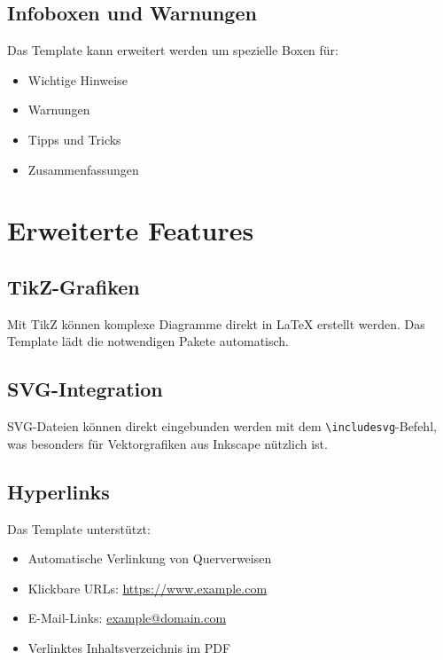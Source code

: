 \subsection*{Infoboxen und Warnungen}
\label{subsec:infoboxen}

Das Template kann erweitert werden um spezielle Boxen für:
\begin{itemize}
	\item Wichtige Hinweise
	\item Warnungen
	\item Tipps und Tricks
	\item Zusammenfassungen
\end{itemize}

\section{Erweiterte Features}
\label{sec:erweiterte_features}

\subsection*{TikZ-Grafiken}
\label{subsec:tikz}

Mit TikZ können komplexe Diagramme direkt in \LaTeX{} erstellt werden. Das Template lädt die notwendigen Pakete automatisch.

\subsection*{SVG-Integration}
\label{subsec:svg}

SVG-Dateien können direkt eingebunden werden mit dem \texttt{\textbackslash includesvg}-Befehl, was besonders für Vektorgrafiken aus Inkscape nützlich ist.

\subsection*{Hyperlinks}
\label{subsec:hyperlinks}

Das Template unterstützt:
\begin{itemize}
	\item Automatische Verlinkung von Querverweisen
	\item Klickbare URLs: \url{https://www.example.com}
	\item E-Mail-Links: \href{mailto:example@domain.com}{example@domain.com}
	\item Verlinktes Inhaltsverzeichnis im PDF
\end{itemize}

